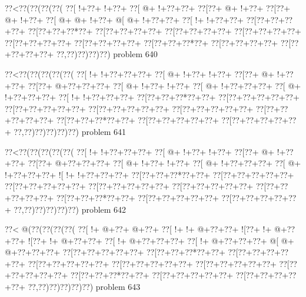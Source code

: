 \vbox{\vbox{\goo
\0??<\0??(\0??(\0??(\0??(
\0??[\- !+\0??+\- !+\0??+
\0??[\- @+\- !+\0??+\0??+
\0??[\0??+\- @+\- !+\0??+
\0??[\0??+\- @+\- !+\0??+
\0??[\- @+\- @+\- !+\0??+
\- @[\- @+\- !+\0??+\0??+
\0??[\- !+\- !+\0??+\0??+
\0??[\0??+\0??+\0??+\0??+
\0??[\0??+\0??+\0??*\0??+
\0??[\0??+\0??+\0??+\0??+
\0??[\0??+\0??+\0??+\0??+
\0??[\0??+\0??+\0??+\0??+
\0??[\0??+\0??+\0??+\0??+
\0??[\0??+\0??+\0??+\0??+
\0??[\0??+\0??+\0??*\0??+
\0??[\0??+\0??+\0??+\0??+
\0??[\0??+\0??+\0??+\0??+
\0??,\0??)\0??)\0??)\0??)
}
\hfil problem 640\hfil\break
}

\vbox{\vbox{\goo
\0??<\0??(\0??(\0??(\0??(\0??(
\0??[\- !+\- !+\0??+\0??+\0??+
\0??[\- @+\- !+\0??+\- !+\0??+
\0??[\0??+\- @+\- !+\0??+\0??+
\0??[\0??+\- @+\0??+\0??+\0??+
\0??[\- @+\- !+\0??+\- !+\0??+
\0??[\- @+\- !+\0??+\0??+\0??+
\0??[\- @+\- !+\0??+\0??+\0??+
\0??[\- !+\- !+\0??+\0??+\0??+
\0??[\0??+\0??+\0??*\0??+\0??+
\0??[\0??+\0??+\0??+\0??+\0??+
\0??[\0??+\0??+\0??+\0??+\0??+
\0??[\0??+\0??+\0??+\0??+\0??+
\0??[\0??+\0??+\0??+\0??+\0??+
\0??[\0??+\0??+\0??+\0??+\0??+
\0??[\0??+\0??+\0??*\0??+\0??+
\0??[\0??+\0??+\0??+\0??+\0??+
\0??[\0??+\0??+\0??+\0??+\0??+
\0??,\0??)\0??)\0??)\0??)\0??)
}
\hfil problem 641\hfil\break
}

\vbox{\vbox{\goo
\0??<\0??(\0??(\0??(\0??(\0??(
\0??[\- !+\- !+\0??+\0??+\0??+
\0??[\- @+\- !+\0??+\- !+\0??+
\0??[\0??+\- @+\- !+\0??+\0??+
\0??[\0??+\- @+\0??+\0??+\0??+
\0??[\- @+\- !+\0??+\- !+\0??+
\0??[\- @+\- !+\0??+\0??+\0??+
\0??[\- @+\- !+\0??+\0??+\0??+
\- ![\- !+\- !+\0??+\0??+\0??+
\0??[\0??+\0??+\0??*\0??+\0??+
\0??[\0??+\0??+\0??+\0??+\0??+
\0??[\0??+\0??+\0??+\0??+\0??+
\0??[\0??+\0??+\0??+\0??+\0??+
\0??[\0??+\0??+\0??+\0??+\0??+
\0??[\0??+\0??+\0??+\0??+\0??+
\0??[\0??+\0??+\0??*\0??+\0??+
\0??[\0??+\0??+\0??+\0??+\0??+
\0??[\0??+\0??+\0??+\0??+\0??+
\0??,\0??)\0??)\0??)\0??)\0??)
}
\hfil problem 642\hfil\break
}

\vbox{\vbox{\goo
\0??<\- @(\0??(\0??(\0??(\0??(
\0??[\- !+\- @+\0??+\- @+\0??+
\0??[\- !+\- !+\- @+\0??+\0??+
\- ![\0??+\- !+\- @+\0??+\0??+
\- ![\0??+\- !+\- @+\0??+\0??+
\0??[\- !+\- @+\0??+\0??+\0??+
\0??[\- !+\- @+\0??+\0??+\0??+
\- @[\- @+\- @+\0??+\0??+\0??+
\0??[\0??+\0??+\0??+\0??+\0??+
\0??[\0??+\0??+\0??*\0??+\0??+
\0??[\0??+\0??+\0??+\0??+\0??+
\0??[\0??+\0??+\0??+\0??+\0??+
\0??[\0??+\0??+\0??+\0??+\0??+
\0??[\0??+\0??+\0??+\0??+\0??+
\0??[\0??+\0??+\0??+\0??+\0??+
\0??[\0??+\0??+\0??*\0??+\0??+
\0??[\0??+\0??+\0??+\0??+\0??+
\0??[\0??+\0??+\0??+\0??+\0??+
\0??,\0??)\0??)\0??)\0??)\0??)
}
\hfil problem 643\hfil\break
}

